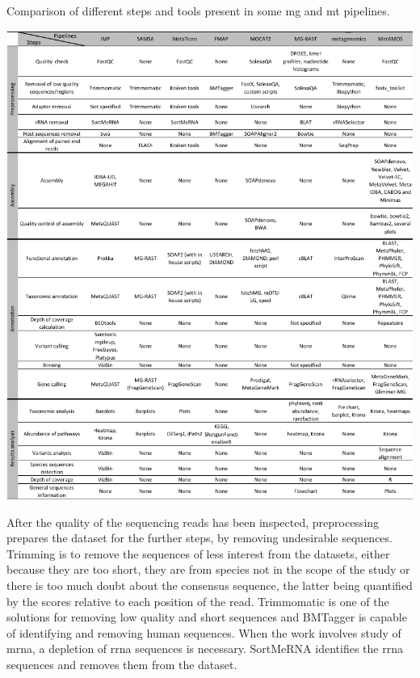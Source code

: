 \documentclass[
  oneside,
  11pt, a4paper,
  footinclude=true,
  headinclude=true,
  cleardoublepage=empty
]{scrbook}
\begin{document}
    \begin{table}[!h]    
    \caption{Comparison of different steps and tools present in some \gls{mg} and \gls{mt} pipelines.}
    \includegraphics[width=\columnwidth]{FiguresUndTables/State_of_art/pipelines_review.pdf}
    \label{fig:pipelinesreview}
    \end{table}
    
    After the quality of the sequencing reads has been inspected, preprocessing prepares the dataset for the further steps, by removing undesirable sequences. Trimming is to remove the sequences of less interest from the datasets, either because they are too short, they are from species not in the scope of the study or there is too much doubt about the consensus sequence, the latter being quantified by the scores relative to each position of the read. Trimmomatic \citep{bolger2014trimmomatic} is one of the solutions for removing low quality and short sequences and BMTagger \citep{rotmistrovsky2011bmtagger} is capable of identifying and removing human sequences. When the work involves study of \gls{mrna}, a depletion of \gls{rrna} sequences is necessary. SortMeRNA \citep{doi:10.1093/bioinformatics/bts611} identifies the \gls{rrna} sequences and removes them from the dataset.
\end{document}
